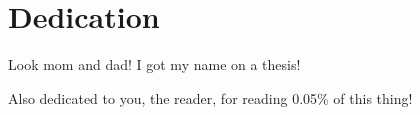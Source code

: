 
\begingroup
\let\clearpage\relax
\let\cleardoublepage\relax
\let\cleardoublepage\relax
\chapter*{Dedication}

\begin{center}
  Look mom and dad! I got my name on a thesis!
  
  \vspace{2 em}
  
  \noindent
  Also dedicated to you, the reader, for reading 0.05\% of this thing!
\end{center}

\endgroup
